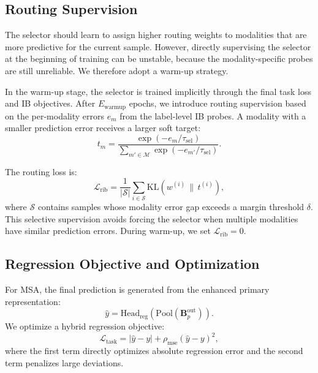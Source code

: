 \documentclass[11pt]{article}
\begin{document}
\subsection{Routing Supervision}
\label{sec:method-rib}

The selector should learn to assign higher routing weights to modalities that
are more predictive for the current sample. However, directly supervising the
selector at the beginning of training can be unstable, because the
modality-specific probes are still unreliable. We therefore adopt a warm-up
strategy.

In the warm-up stage, the selector is trained implicitly through the final task
loss and IB objectives. After $E_{\mathrm{warmup}}$ epochs, we introduce
routing supervision based on the per-modality errors $e_m$ from the
label-level IB probes. A modality with a smaller prediction error receives a
larger soft target:
\begin{equation}
t_m =
\frac{\exp(-e_m/\tau_{\mathrm{sel}})}
{\sum_{m'\in\mathcal{M}}\exp(-e_{m'}/\tau_{\mathrm{sel}})}.
\end{equation}

The routing loss is:
\begin{equation}
\mathcal{L}_{\mathrm{rib}}
=
\frac{1}{|\mathcal{S}|}
\sum_{i\in\mathcal{S}}
\mathrm{KL}(w^{(i)}\,\|\,t^{(i)}),
\end{equation}
where $\mathcal{S}$ contains samples whose modality error gap exceeds a margin
threshold $\delta$. This selective supervision avoids forcing the selector
when multiple modalities have similar prediction errors. During warm-up, we
set $\mathcal{L}_{\mathrm{rib}}=0$.

\subsection{Regression Objective and Optimization}
\label{sec:method-loss}

For MSA, the final prediction is generated from the enhanced primary
representation:
\begin{equation}
\hat{y}
=
\mathrm{Head}_{\mathrm{reg}}
\!\left(
\mathrm{Pool}(\mathbf{B}_p^{\mathrm{out}})
\right).
\end{equation}
We optimize a hybrid regression objective:
\begin{equation}
\mathcal{L}_{\mathrm{task}}
=
|\hat{y}-y|
+
\rho_{\mathrm{mse}}(\hat{y}-y)^2,
\end{equation}
where the first term directly optimizes absolute regression error and the
second term penalizes large deviations.
\end{document}

